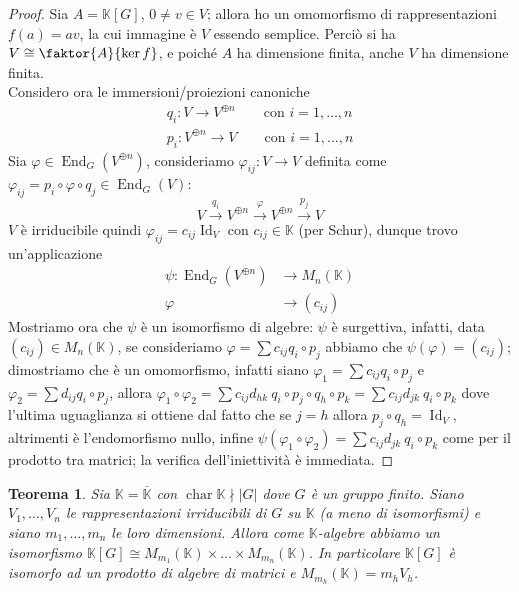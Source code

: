 \documentclass[11pt]{article}
\theoremstyle{plain}
\newtheorem{thm}{Teorema}[section]
\theoremstyle{definition}
\theoremstyle{remark}
\newcommand{\K}{\mathbb{K}}
\DeclareMathOperator{\End}{End}
\DeclareMathOperator{\Id}{Id}
\DeclareMathOperator{\Char}{char}
\begin{document}
\begin{proof}
	Sia $A=\K[G]$, $0\neq v\in V$; allora ho un omomorfismo di rappresentazioni $f(a)=av$, la cui immagine è $V$ essendo semplice. Perciò si ha $V\cong\faktor{A}{\ker f}$, e poiché $A$ ha dimensione finita, anche $V$ ha dimensione finita.\\
	Considero ora le immersioni/proiezioni canoniche
	\begin{align*}
		q_i:V\to V^{\oplus n}\qquad \text{con }i=1,\ldots,n\\
		p_i:V^{\oplus n}\to V\qquad \text{con }i=1,\ldots,n
	\end{align*}
	Sia $\varphi\in \End_G(V^{\oplus n})$, consideriamo $\varphi_{ij}:V\to V$ definita come $\varphi_{ij} = p_i\circ\varphi\circ q_j\in\End_G(V)$:
	\[
		V \xrightarrow{q_i} V^{\oplus n} \xrightarrow{\varphi} V^{\oplus n} \xrightarrow{p_j} V
	\]
	$V$ è irriducibile quindi $\varphi_{ij} = c_{ij}\Id_V$ con $c_{ij}\in \K$ (per Schur), dunque trovo un'applicazione
	\begin{align*}
		\psi:\End_G(V^{\oplus n})&\to M_n(\K)\\
		\varphi&\to (c_{ij})
	\end{align*}
	Mostriamo ora che $\psi$ è un isomorfismo di algebre: $\psi$ è surgettiva, infatti, data $(c_{ij})\in M_n(\K)$, se consideriamo $\varphi = \sum c_{ij} q_i\circ p_j$ abbiamo che $\psi(\varphi) = (c_{ij})$; dimostriamo che è un omomorfismo, infatti siano $\varphi_1 = \sum c_{ij} q_i\circ p_j$ e $\varphi_2 = \sum d_{ij} q_i\circ p_j$, allora $\varphi_1\circ\varphi_2 = \sum c_{ij} d_{hk}\ q_i\circ p_j\circ q_h\circ p_k = \sum c_{ij}d_{jk}\ q_i\circ p_k$ dove l'ultima uguaglianza si ottiene dal fatto che se $j=h$ allora $p_j\circ q_h=\Id_V$, altrimenti è l'endomorfismo nullo, infine $\psi(\varphi_1\circ \varphi_2) = \sum c_{ij}d_{jk}\  q_i\circ p_k$ come per il prodotto tra matrici; la verifica dell'iniettività è immediata.
\end{proof}

\begin{thm}
	Sia $\K=\overline{\K}$ con $\Char \K \nmid |G|$ dove $G$ è un gruppo finito. Siano $V_1,\ldots,V_n$ le rappresentazioni irriducibili di $G$ su $\K$ (a meno di isomorfismi) e siano $m_1,\ldots,m_n$ le loro dimensioni. Allora come $\K$-algebre abbiamo un isomorfismo $\K[G] \cong M_{m_1}(\K)\times\ldots\times M_{m_n}(\K)$. In particolare $\K[G]$ è isomorfo ad un prodotto di algebre di matrici e $M_{m_h}(\K) = m_hV_h$.
\end{thm}
\end{document}
